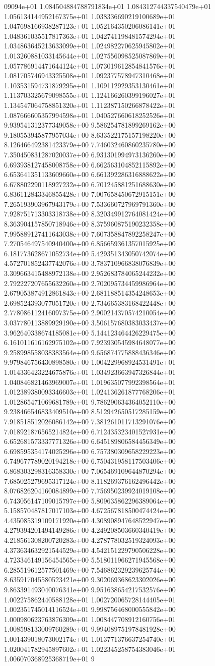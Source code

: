 09094e+01	1.084504884788791834e+01	1.084312744337540479e+01	1.056134144952167375e+01	1.038336690219100689e+01	1.047698166938287123e+01	1.052164350206086141e+01	1.048361035517817363e+01	1.042741198481574294e+01	1.034863645213633099e+01	1.024982270625945802e+01	1.013260881033145644e+01	1.027556098525087869e+01	1.057786914471644124e+01	1.073019612854841576e+01	1.081705746943325508e+01	1.092377578947310468e+01	1.103531594731879295e+01	1.109112929353130461e+01	1.113703325679098555e+01	1.124166260399196027e+01	1.134547064758851320e+01	1.112387150266878422e+01	1.087666605357994598e+01	1.040527660618252526e+01	9.939541312377349058e+00	9.586254781899269162e+00	9.180553945877957034e+00	8.633522175157198220e+00	8.126466492381423379e+00	7.746032460860235780e+00	7.350450831287020037e+00	6.931301994973136260e+00	6.693938127458008758e+00	6.662563104852115892e+00	6.653641351133609660e+00	6.661392286316888622e+00	6.678802290118927232e+00	6.701245881251688630e+00	6.836112843346855428e+00	7.007658450672915151e+00	7.265193903967943179e+00	7.533660727969791360e+00	7.928751713303318738e+00	8.320349912764081424e+00	8.363904157850718946e+00	8.375960875190232358e+00	7.995889127411643038e+00	7.607358847892258247e+00	7.270546497540940400e+00	6.856659361357015925e+00	6.181773628671052734e+00	5.429351343050742074e+00	4.572701852437742076e+00	3.783710966838076839e+00	3.309663415488972138e+00	2.952683784065244232e+00	2.792227207655632260e+00	2.702095734459986964e+00	2.679053874912861843e+00	2.681188514354248653e+00	2.698524393077051720e+00	2.734665383168422448e+00	2.778086112416097375e+00	2.900214370574210054e+00	3.037780113889929190e+00	3.506157680383033437e+00	3.962640338674185081e+00	5.144123464426229475e+00	6.161011616162975102e+00	7.923930545984648077e+00	9.258998558038383564e+00	9.656874775888436346e+00	9.979846756430898580e+00	1.004229968924531491e+01	1.014336423224675876e+01	1.034923663947326844e+01	1.040846821463969007e+01	1.019635077992398564e+01	1.012389380093346603e+01	1.024136261877768206e+01	1.012865471069681789e+01	9.786290634364052110e+00	9.238466546833409510e+00	8.512942650517285159e+00	7.918518512026086142e+00	7.381261011713291076e+00	7.018921876565214824e+00	6.712435323401527931e+00	6.652681573337771326e+00	6.645189806584456349e+00	6.698595354174025296e+00	6.757380309658229223e+00	6.749677789020194218e+00	6.750431958117503406e+00	6.868303298316358330e+00	7.065469109644870294e+00	7.685025279695317124e+00	8.118269376162496442e+00	8.076826204160084899e+00	7.756950239924019108e+00	6.743056147109015797e+00	5.809635862296389064e+00	5.158570487817017103e+00	4.672567818500474424e+00	4.435085319109171920e+00	4.308908947648522947e+00	4.279394201494149286e+00	4.249208503660340419e+00	4.218561308200720283e+00	4.278778032519324093e+00	4.373634632921544529e+00	4.542151229790506228e+00	4.723346149156454565e+00	5.518011966271945568e+00	6.285519612577501469e+00	7.546862329239625744e+00	8.635917045580523421e+00	9.302069368623302026e+00	9.863391493040076341e+00	9.951638654217532576e+00	1.002275862440588128e+01	1.002720065728144405e+01	1.002351745014116524e+01	9.998756468000555842e+00	1.000980623763876309e+01	1.008447708912160756e+01	1.008598133009760289e+01	9.994089751978481928e+00	1.001439018073002174e+01	1.013771376637254740e+01	1.020041782945897602e+01	1.022345258754383046e+01	1.006070368925368719e+01	9